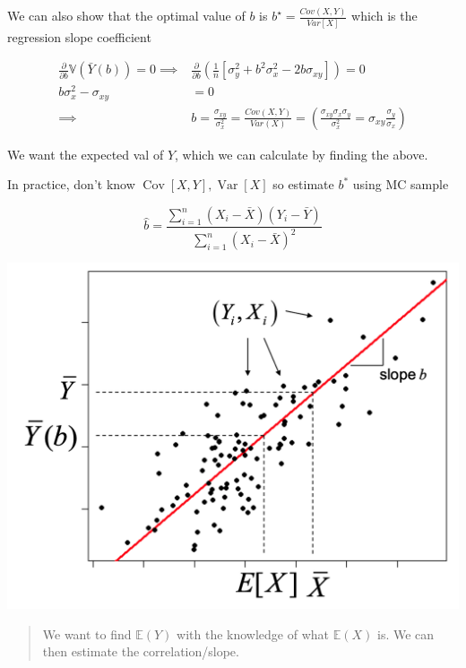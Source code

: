 \documentclass[
  oneside]{book}
\begin{document}
We can also show that the optimal value of \(b\) is \(b^{\star}= \frac{Cov(X,Y)}{Var[X]}\) which is the regression slope coefficient

\[
\begin{aligned}
\frac{ \partial  }{ \partial b } \mathbb{V}(\bar{Y}(b)) = 0 \implies& \frac{ \partial  }{ \partial b } \left( \frac{1}{n} [\sigma^{2}_{y}+b^{2}\sigma^{2}_{x}-2b\sigma_{xy}] \right) = 0\\
b\sigma^{2}_{x}-\sigma_{xy}&= 0\\
\implies& b = \frac{\sigma_{xy}}{\sigma_{x}^{2}} = \frac{Cov(X,Y)}{Var(X)} = \left( \frac{\sigma_{xy}\sigma_{x}\sigma_{y}}{\sigma_{x}^{2}} = \sigma_{xy} \frac{\sigma_{y}}{\sigma_{x}} \right) 
\end{aligned}
\]

We want the expected val of \(Y\), which we can calculate by finding the above.

In practice, don't know \(\operatorname{Cov}[X, Y], \operatorname{Var}[X]\) so estimate \(b^*\) using MC sample

\[
\hat{b}=\frac{\sum_{i=1}^n\left(X_i-\bar{X}\right)\left(Y_i-\bar{Y}\right)}{\sum_{i=1}^n\left(X_i-\bar{X}\right)^2}
\]

\includegraphics{Notes/Obsidian-Attachments/12-Simulation-Variance-Reduction-2.png}

\begin{quote}
We want to find \(\mathbb{E}(Y)\) with the knowledge of what \(\mathbb{E}(X)\) is. We can then estimate the correlation/slope.
\end{quote}
\end{document}
